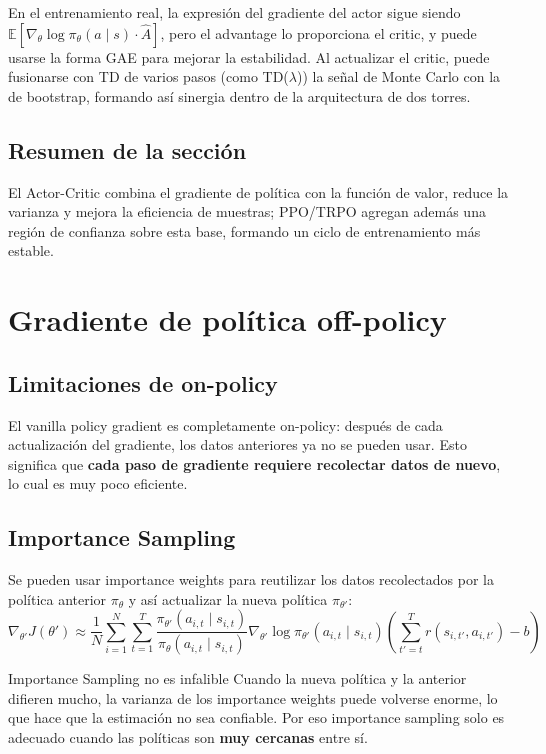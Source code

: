\documentclass[a4paper]{article}
\begin{document}
En el entrenamiento real, la expresión del gradiente del actor sigue siendo $\mathbb{E}[\nabla_\theta \log \pi_\theta(a\mid s) \cdot \hat{A}]$, pero el advantage lo proporciona el critic, y puede usarse la forma GAE para mejorar la estabilidad. Al actualizar el critic, puede fusionarse con TD de varios pasos (como TD($\lambda$)) la señal de Monte Carlo con la de bootstrap, formando así sinergia dentro de la arquitectura de dos torres.

\subsection{Resumen de la sección}
El Actor-Critic combina el gradiente de política con la función de valor, reduce la varianza y mejora la eficiencia de muestras; PPO/TRPO agregan además una región de confianza sobre esta base, formando un ciclo de entrenamiento más estable.

\section{Gradiente de política off-policy}

\subsection{Limitaciones de on-policy}

El vanilla policy gradient es completamente on-policy: después de cada actualización del gradiente, los datos anteriores ya no se pueden usar. Esto significa que \textbf{cada paso de gradiente requiere recolectar datos de nuevo}, lo cual es muy poco eficiente.

\subsection{Importance Sampling}

Se pueden usar importance weights para reutilizar los datos recolectados por la política anterior $\pi_\theta$ y así actualizar la nueva política $\pi_{\theta'}$:
$$\nabla_{\theta'} J(\theta') \approx \frac{1}{N}\sum_{i=1}^{N}\sum_{t=1}^{T} \frac{\pi_{\theta'}(a_{i,t} \mid s_{i,t})}{\pi_\theta(a_{i,t} \mid s_{i,t})} \nabla_{\theta'} \log \pi_{\theta'}(a_{i,t} \mid s_{i,t}) \left(\sum_{t'=t}^{T} r(s_{i,t'}, a_{i,t'}) - b\right)$$

\begin{warningbox}{Importance Sampling no es infalible}
Cuando la nueva política y la anterior difieren mucho, la varianza de los importance weights puede volverse enorme, lo que hace que la estimación no sea confiable. Por eso importance sampling solo es adecuado cuando las políticas son \textbf{muy cercanas} entre sí.
\end{warningbox}
\end{document}
